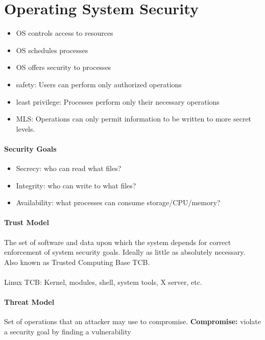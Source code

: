 \section{Operating System Security}

\begin{itemize}
    \item OS controls access to resources
    \item OS schedules processes
    \item OS offers security to processes
\end{itemize}

\begin{itemize}
    \item safety: Users can perform only authorized operations
    \item least privilege: Processes perform only their necessary operations
    \item MLS: Operations can only permit information to be written to more secret levels.
\end{itemize}

\paragraph{Security Goals}
\begin{itemize}
    \item Secrecy: who can read what files?
    \item Integrity: who can write to what files?
    \item Availability: what processes can consume storage/CPU/memory?
\end{itemize}

\paragraph{Trust Model}
The set of software and data upon which the system depends for correct enforcement of system security goals. Ideally as little as absolutely necessary. Also known as Trusted Computing Base TCB.\\
\\
Linux TCB: Kernel, modules, shell, system tools, X server, etc.

\paragraph{Threat Model}
Set of operations that an attacker may use to compromise. 
\textbf{Compromise: }violate a security goal by finding a
vulnerability

